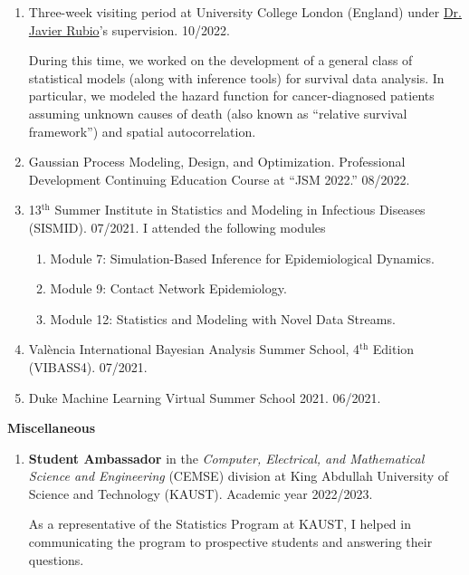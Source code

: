 \documentclass[11pt, ]{article}
\begin{document}
	\begin{enumerate}
		\item Three-week visiting period at University College London (England) under \href{https://sites.google.com/site/fjavierrubio67/}{Dr. Javier Rubio}'s supervision. 10/2022.
		
		During this time, we worked on the development of a general class of statistical models (along with inference tools) for survival data analysis. In particular, we modeled the hazard function for cancer-diagnosed patients assuming unknown causes of death (also known as ``relative survival framework'') and spatial autocorrelation.
		
		\item Gaussian Process Modeling, Design, and Optimization. Professional Development Continuing Education Course at ``JSM 2022.'' 08/2022.
		
		\item 13${}^{\text{th}}$ Summer Institute in Statistics and Modeling in Infectious Diseases (SISMID). 07/2021. I attended the following modules \vspace{-6pt}
		\begin{enumerate}[label*=\arabic*., noitemsep]
			\item Module 7: Simulation-Based Inference for Epidemiological Dynamics.
			\item Module 9: Contact Network Epidemiology.
			\item Module 12: Statistics and Modeling with Novel Data Streams.
		\end{enumerate}
		
		\item València International Bayesian Analysis Summer School, 4${}^{\text{th}}$ Edition (VIBASS4). 07/2021.
		
		\item Duke Machine Learning Virtual Summer School 2021. 06/2021.
	\end{enumerate}


\vspace{6pt}

{\Large \textbf{Miscellaneous}}

	\begin{enumerate}
		\item \textbf{Student Ambassador} in the\textit{ Computer, Electrical,  and Mathematical Science and Engineering} (CEMSE) division at King Abdullah University of Science and Technology (KAUST). Academic year 2022/2023.
		
		As a representative of the Statistics Program at KAUST, I helped in communicating the program to prospective students and answering their questions.
	\end{enumerate}
\end{document}
